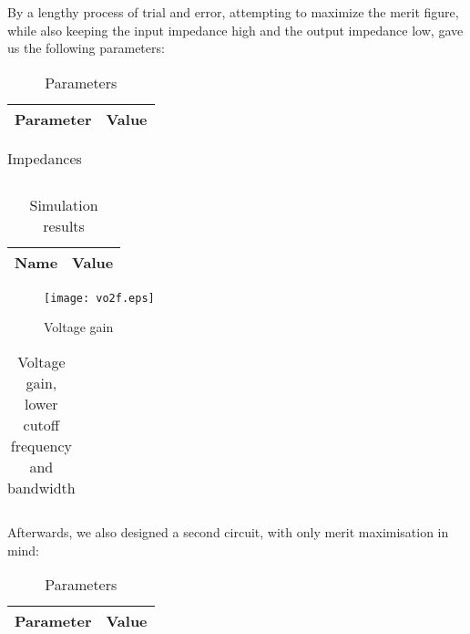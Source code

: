 By a lengthy process of trial and error, attempting to maximize the merit figure, while also keeping the input impedance high and the output impedance low, gave us the following parameters:

\begin{table}[H]
        \centering
        \begin{tabular}{|c|c|}
        \hline
        Parameter & Value \\
        \hline
        
        \hline
        \end{tabular}
        \caption{Parameters}
        \label{param}
\end{table}

\begin{table}[H]
  \centering
  \begin{tabular}{|c|c|}
    \hline
        
        \hline
  \end{tabular}
  \caption{Impedances}
  \label{tab:sim_imp}
\end{table}

\begin{table}[H]
  \centering
  \begin{tabular}{|c|c|}
    \hline
        {\bf Name} & {\bf Value} \\
        \hline
        \hline
        
        \hline
  \end{tabular}
  \caption{Simulation results}
\end{table}

\begin{figure}[H]
\centering
\texttt{[image: vo2f.eps]}
\caption{Voltage gain}
\label{vg}
\end{figure}

\begin{table}[H]
  \centering
  \begin{tabular}{|c|c|}
    \hline
        
        \hline
  \end{tabular}
  \caption{Voltage gain, lower cutoff frequency and bandwidth}
  \label{tab:res_sim}
\end{table}

Afterwards, we also designed a second circuit, with only merit maximisation in mind:

\begin{table}[H]
        \centering
        \begin{tabular}{|c|c|}
        \hline
        Parameter & Value \\
        \hline
        
        \hline
        \end{tabular}
        \caption{Parameters}
        \label{param_mb}
\end{table}


